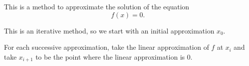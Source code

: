 \begin{SaveDefinition}[key=Newton, title={Newton's Method}]

This is a method to approximate the solution of the equation
\[
f(x)=0.
\]

This is an iterative method, so we start with an initial approximation $x_0$.

For each successive approximation, take the linear approximation of $f$ at $x_i$ and take $x_{i+1}$ to be the point where the linear approximation is 0.
\end{SaveDefinition}



